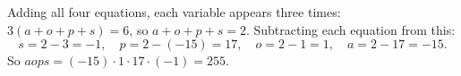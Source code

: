 Adding all four equations, each variable appears three times: $3(a+o+p+s)=6$, so $a+o+p+s=2$. Subtracting each equation from this:
\[
s=2-3=-1,\quad p=2-(-15)=17,\quad o=2-1=1,\quad a=2-17=-15 .
\]
So $aops=(-15)\cdot1\cdot17\cdot(-1)=\boxed{255}$.
